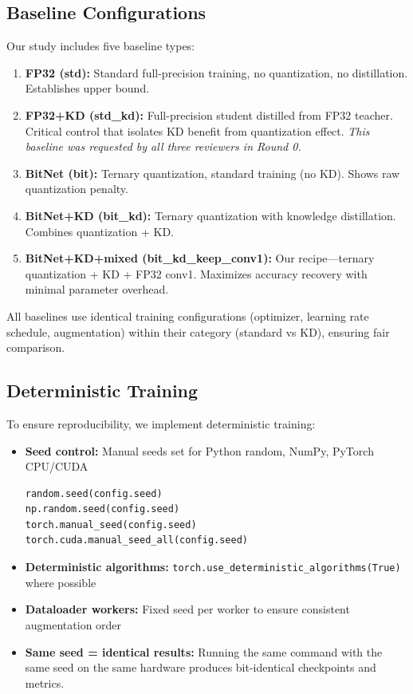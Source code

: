 \subsection{Baseline Configurations}
\label{sec:methods:baselines}

Our study includes five baseline types:

\begin{enumerate}
    \item \textbf{FP32 (std):} Standard full-precision training, no quantization, no distillation. Establishes upper bound.

    \item \textbf{FP32+KD (std\_kd):} Full-precision student distilled from FP32 teacher. Critical control that isolates KD benefit from quantization effect. \textit{This baseline was requested by all three reviewers in Round 0.}

    \item \textbf{BitNet (bit):} Ternary quantization, standard training (no KD). Shows raw quantization penalty.

    \item \textbf{BitNet+KD (bit\_kd):} Ternary quantization with knowledge distillation. Combines quantization + KD.

    \item \textbf{BitNet+KD+mixed (bit\_kd\_keep\_conv1):} Our recipe—ternary quantization + KD + FP32 conv1. Maximizes accuracy recovery with minimal parameter overhead.
\end{enumerate}

All baselines use identical training configurations (optimizer, learning rate schedule, augmentation) within their category (standard vs KD), ensuring fair comparison.

\subsection{Deterministic Training}
\label{sec:methods:deterministic}

To ensure reproducibility, we implement deterministic training:

\begin{itemize}
    \item \textbf{Seed control:} Manual seeds set for Python random, NumPy, PyTorch CPU/CUDA
    \begin{verbatim}
random.seed(config.seed)
np.random.seed(config.seed)
torch.manual_seed(config.seed)
torch.cuda.manual_seed_all(config.seed)
    \end{verbatim}

    \item \textbf{Deterministic algorithms:} \texttt{torch.use\_deterministic\_algorithms(True)} where possible

    \item \textbf{Dataloader workers:} Fixed seed per worker to ensure consistent augmentation order

    \item \textbf{Same seed = identical results:} Running the same command with the same seed on the same hardware produces bit-identical checkpoints and metrics.
\end{itemize}

